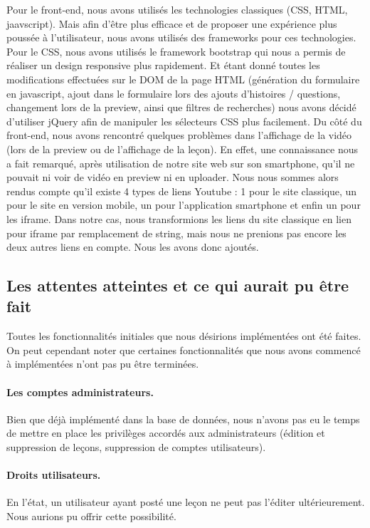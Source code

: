 Pour le front-end, nous avons utilisés les technologies classiques (CSS, HTML, jaavscript). Mais afin d'être plus efficace et de proposer une expérience plus poussée à l'utilisateur, nous avons utilisés des frameworks pour ces technologies. \linebreak 
Pour le CSS, nous avons utilisés le framework bootstrap qui nous a permis de réaliser un design responsive plus rapidement. Et étant donné toutes les modifications effectuées sur le DOM de la page HTML (génération du formulaire en javascript, ajout dans le formulaire lors des ajouts d'histoires / questions, changement lors de la preview, ainsi que filtres de recherches) nous avons décidé d'utiliser jQuery afin de manipuler les sélecteurs CSS plus facilement. \linebreak
Du côté du front-end, nous avons rencontré quelques problèmes dans l'affichage de la vidéo (lors de la preview ou de l'affichage de la leçon). En effet, une connaissance nous a fait remarqué, après utilisation de notre site web sur son smartphone, qu'il ne pouvait ni voir de vidéo en preview ni en uploader. Nous nous sommes alors rendus compte qu'il existe 4 types de liens Youtube : 1 pour le site classique, un pour le site en version mobile, un pour l'application smartphone et enfin un pour les iframe. Dans notre cas, nous transformions les liens du site classique en lien pour iframe par remplacement de string, mais nous ne prenions pas encore les deux autres liens en compte. Nous les avons donc ajoutés.

\subsection{Les attentes atteintes et ce qui aurait pu être fait}
Toutes les fonctionnalités initiales que nous désirions implémentées ont été faites. On peut cependant noter que certaines fonctionnalités que nous avons commencé à implémentées n'ont pas pu être terminées.

\paragraph{Les comptes administrateurs.}
Bien que déjà implémenté dans la base de données, nous n'avons pas eu le temps de mettre en place les privilèges accordés aux administrateurs (édition et suppression de leçons, suppression de comptes utilisateurs).

\paragraph{Droits utilisateurs.}
En l'état, un utilisateur ayant posté une leçon ne peut pas l'éditer ultérieurement. Nous aurions pu offrir cette possibilité.


